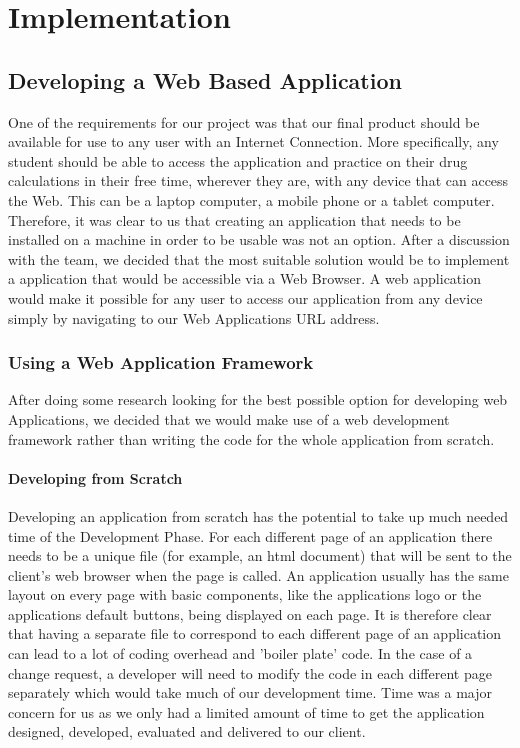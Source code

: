 \documentclass{l3proj}
\begin{document}
\chapter{Implementation}
\label{implementation}
\section{Developing a Web Based Application }
One of the requirements for our project was that our final product should be available for 
use to any user with an Internet Connection. More specifically, any student should be 
able to access the application and practice on their drug calculations in their free time, 
wherever they are, with any device that can access the Web. This can be a laptop 
computer, a mobile phone or a tablet computer. \\ 
Therefore, it was clear to us that creating an application that needs to be installed on a 
machine in order to be usable was not an option. After a discussion with the team, we 
decided that the most suitable solution would be to implement a application that would be 
accessible via a Web Browser. A web application would make it possible for any user to 
access our application from any device simply by navigating to our Web Applications 
URL address. \\ 
\subsection {Using a Web Application Framework}
After doing some research looking for the best possible option for developing web 
Applications, we decided that we would make use of a web development framework 
rather than writing the code for the whole application from scratch.
\subsubsection{ Developing from Scratch}
Developing an application from scratch has the potential to take up much needed time 
of the Development Phase. For each different page of an application there needs to be 
a unique file (for example, an html document) that will be sent to the client's web browser 
when the page is called. An application usually has the same layout on every page with 
basic components, like the applications logo or the applications default buttons, being 
displayed on each page. It is therefore clear that having a separate file to correspond to 
each different page of an application can lead to a lot of coding overhead and 'boiler 
plate' code. In the case of a change request, a developer will need to modify the code in 
each different page separately which would take much of our development time. Time was a major concern for us as we only had a limited amount of time to get the application designed, developed, evaluated and delivered to our client.
\end{document}
